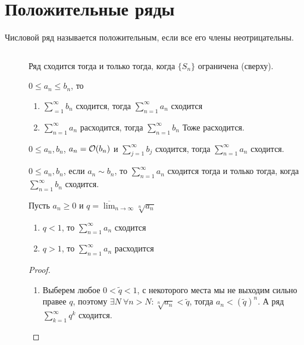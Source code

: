 \section{Положительные ряды}
\begin{defn}
    Числовой ряд называется {\sf положительным}, если все его члены неотрицательны.  
\end{defn}
\begin{prop}

    $ $
    \begin{description}
	\item[] Ряд сходится тогда и только тогда, когда  $ \{S_n\}$ ограничена (сверху).

	\item[] $ 0 \le a_n \le b_n$, то
	    \begin{enumerate}
		\item $ \sum_{=1}^{\infty} b_n$ сходится, тогда $ \sum_{n=1}^{\infty} a_n $ сходится
		\item $ \sum_{n=1}^{\infty} a_n$ расходится, тогда $ \sum_{n=1}^{\infty} b_n$ Тоже расходится.
	    \end{enumerate}

	\item[] $ 0 \le a_n, b_n$, $ a_n = \mathcal{O}(b_n)$ и  $ \sum_{j=1}^{\infty} b_j$ сходится, тогда $ \sum_{n=1}^{\infty} a_n$ сходится. 

	\item[] $ 0 \le a_n , b_n$, если  $ a_n \sim  b_n$, то  $ \sum_{n=1}^{\infty} a_n$ сходится тогда и только тогда, когда  $ \sum_{n=1}^{\infty} b_n$ сходится.

	\item[]
		Пусть $ a_n \ge 0$ и $ q = \overline{\lim}_{n \to \infty} \sqrt[n]{ a_n} $
	    \begin{enumerate}
		\item $ q < 1$, то  $ \sum_{n=1}^{\infty} a_n $ сходится
		    \item $ q > 1$, то $ \sum_{n=1}^{\infty}a_n $ расходится
	    \end{enumerate}
	    \begin{proof}
		$ $
	        \begin{enumerate}
		    \item Выберем любое $ 0<\tilde q < 1 $, с некоторого места мы не выходим сильно правее  $ q$,
				поэтому  $ \exists  N ~ \forall  n > N \colon \sqrt[n]{ a_n} < \tilde q  $, тогда $ a_n < (\tilde q)^{n}$. А ряд $ \sum_{k=1}^{\infty} q^{k}$ сходится.


\end{enumerate}
\end{proof}
\end{description}
\end{prop}
